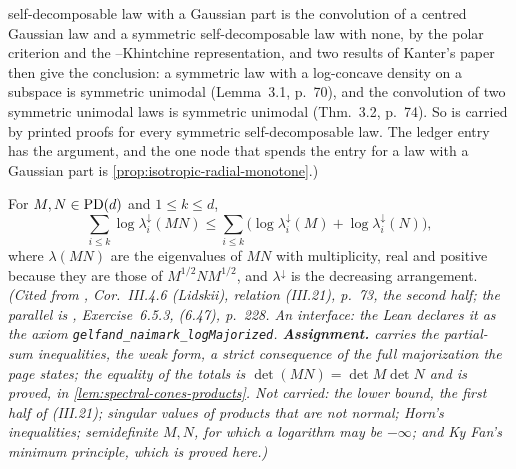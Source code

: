 \begin{theorem}
{self-decomposable law with a Gaussian part is the convolution of a centred Gaussian law and a
symmetric self-decomposable law with none, by the polar criterion and the \Levy--Khintchine
representation, and two results of Kanter's paper then give the conclusion: a symmetric law with a
log-concave density on a subspace is symmetric unimodal (Lemma~3.1, p.~70), and the convolution of
two symmetric unimodal laws is symmetric unimodal (Thm.~3.2, p.~74). So  is carried by
printed proofs for every symmetric self-decomposable law. The ledger entry has the argument, and
the one node that spends the entry for a law with a Gaussian part is
\ref{prop:isotropic-radial-monotone}.)}
\end{theorem}

\begin{theorem}
\label{thm:cited-A9}
\leanok
For $M, N \in \mathrm{PD}(d)$ and $1 \le k \le d$,
\[
  \sum_{i \le k}\log\lambda^\downarrow_i(MN) \le \sum_{i \le k}\bigl(\log\lambda^\downarrow_i(M) +
  \log\lambda^\downarrow_i(N)\bigr) ,
\]
where $\lambda(MN)$ are the eigenvalues of $MN$ with multiplicity, real and positive because they
are those of $M^{1/2}NM^{1/2}$, and $\lambda^\downarrow$ is the decreasing arrangement.
\statusA\quad{}\quad\emph{(Cited from , Cor.~III.4.6 (Lidskii),
relation (III.21), p.~73, the second half; the parallel is ,
Exercise~6.5.3, (6.47), p.~228. An interface: the Lean declares it as the axiom
\texttt{gelfand\_naimark\_logMajorized}. \textbf{Assignment.}  carries the partial-sum
inequalities, the weak form, a strict consequence of the full majorization the page states; the
equality of the totals is $\det(MN) = \det M\det N$ and is proved, in
\ref{lem:spectral-cones-products}. Not carried: the lower bound, the first half of (III.21); singular
values of products that are not normal; Horn's inequalities; semidefinite $M, N$, for which a
logarithm may be $-\infty$; and Ky Fan's minimum principle, which is proved here.)}
\end{theorem}


